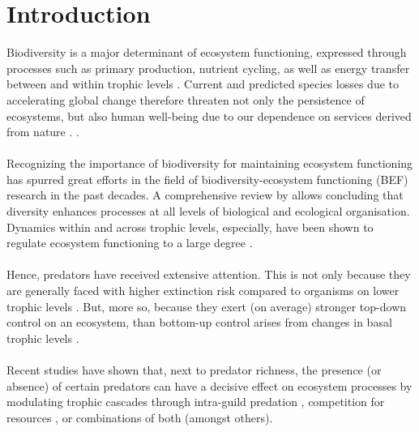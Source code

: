 \chapter{Introduction}
\label{chap:intro}
Biodiversity is a major determinant of ecosystem functioning, expressed through processes such as primary production, nutrient cycling, as well as energy transfer between and within trophic levels \citep[cf.][for review]{Tilman2014}. 
Current and predicted species losses due to accelerating global change \citep[e.g.][]{Ceballos2015, Urban2015} therefore threaten not only the persistence of ecosystems, but also human well-being due to our dependence on services derived from nature \citep{MEA2005,Cardinale2012}. .
\\\\
Recognizing the importance of biodiversity for maintaining ecosystem functioning has spurred great efforts in the field of biodiversity-ecosystem functioning (BEF) research in the past decades.  A comprehensive review by \cite{Cardinale2012} allows concluding that diversity enhances processes at all levels of biological and ecological organisation.  Dynamics within and across trophic levels, especially, have been shown to regulate ecosystem functioning to a large degree \citep{Duffy2007, Estes2011}.  \\\\
Hence, predators have received extensive attention. This is not only because they are generally faced with higher extinction risk compared to organisms on lower trophic levels  \citep{Dobson2006,Ripple2014}. But, more so, because they exert (on average) stronger top-down control on an ecosystem, than bottom-up control arises from changes in basal trophic levels \citep{Borer2006}.  \\\\
Recent studies have shown that, next to predator richness, the presence (or absence) of certain predators can have a decisive effect on ecosystem processes by modulating trophic cascades through intra-guild predation \citep{Finke2005,Wallach2015}, competition for resources  \citep{OConnor2008,Rodriguez-Lozano2015}, or combinations of both (amongst others). %
